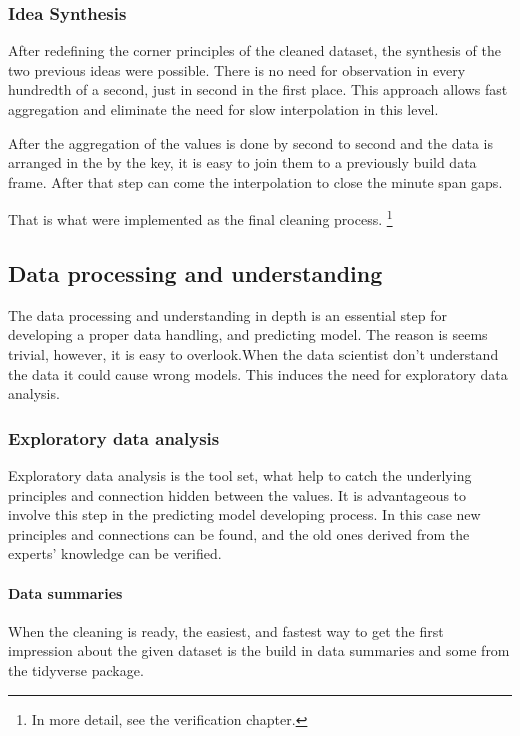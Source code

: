 		\subsubsection{Idea Synthesis}
		After redefining the corner principles of the cleaned dataset, the synthesis of the two previous ideas were possible.
		There is no need for observation in every hundredth of a second, just in second in the first place. This approach allows fast aggregation and eliminate the need for slow interpolation in this level.

		After the aggregation of the values is done by second to second and the data is arranged in the by the key, it is easy to join them to a previously build data frame. After that step can come the interpolation to close the minute span gaps.

		That is what were implemented as the final cleaning process. \footnote{In more detail, see the verification chapter.}
\subsection{Data processing and understanding}
		The data processing and understanding in depth is an essential step for developing a proper data handling, and predicting model.
		The reason is seems trivial, however, it is easy to overlook.When the data scientist don't understand the data it could cause wrong models. This induces the need for exploratory data analysis.
	\subsubsection{Exploratory data analysis}
		Exploratory data analysis is the tool set, what help to catch the underlying principles and connection hidden between the values. It is advantageous to involve this step in the predicting model developing process. In this case new principles and connections can be found, and the old ones derived from the experts' knowledge can be verified.
		\paragraph{Data summaries}
		When the cleaning is ready, the easiest, and fastest way to get the first impression about the given dataset is the build in data summaries and some from the tidyverse package.

